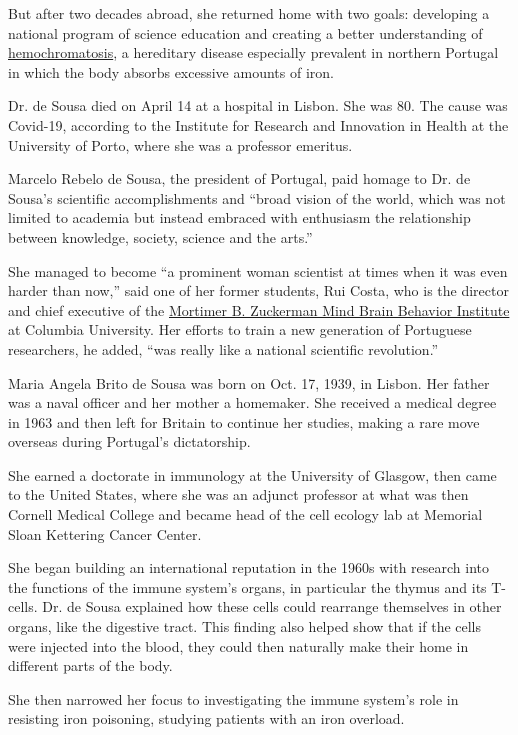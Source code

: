 But after two decades abroad, she returned home with two goals:
developing a national program of science education and creating a better
understanding of
\href{https://www.mayoclinic.org/diseases-conditions/hemochromatosis/symptoms-causes/syc-20351443}{hemochromatosis},
a hereditary disease especially prevalent in northern Portugal in which
the body absorbs excessive amounts of iron.

Dr. de Sousa died on April 14 at a hospital in Lisbon. She was 80. The
cause was Covid-19, according to the Institute for Research and
Innovation in Health at the University of Porto, where she was a
professor emeritus.

Marcelo Rebelo de Sousa, the president of Portugal, paid homage to Dr.
de Sousa's scientific accomplishments and ``broad vision of the world,
which was not limited to academia but instead embraced with enthusiasm
the relationship between knowledge, society, science and the arts.''

She managed to become ``a prominent woman scientist at times when it was
even harder than now,'' said one of her former students, Rui Costa, who
is the director and chief executive of the
\href{https://zuckermaninstitute.columbia.edu/}{Mortimer B. Zuckerman
Mind Brain Behavior Institute} at Columbia University. Her efforts to
train a new generation of Portuguese researchers, he added, ``was really
like a national scientific revolution.''

Maria Angela Brito de Sousa was born on Oct. 17, 1939, in Lisbon. Her
father was a naval officer and her mother a homemaker. She received a
medical degree in 1963 and then left for Britain to continue her
studies, making a rare move overseas during Portugal's dictatorship.

She earned a doctorate in immunology at the University of Glasgow, then
came to the United States, where she was an adjunct professor at what
was then Cornell Medical College and became head of the cell ecology lab
at Memorial Sloan Kettering Cancer Center.

She began building an international reputation in the 1960s with
research into the functions of the immune system's organs, in particular
the thymus and its T-cells. Dr. de Sousa explained how these cells could
rearrange themselves in other organs, like the digestive tract. This
finding also helped show that if the cells were injected into the blood,
they could then naturally make their home in different parts of the
body.

She then narrowed her focus to investigating the immune system's role in
resisting iron poisoning, studying patients with an iron overload.

